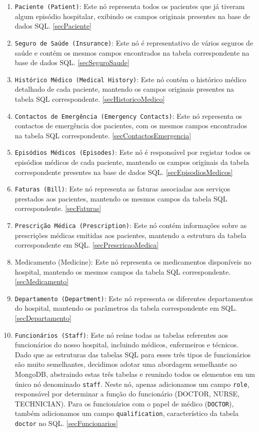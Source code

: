 \begin{enumerate}
    \item \texttt{Paciente (Patient)}: Este nó representa todos os pacientes que já tiveram algum episódio hospitalar, exibindo os campos originais presentes na base de dados SQL. \ref{secPaciente}
    \item \texttt{Seguro de Saúde (Insurance)}: Este nó é representativo de vários seguros de saúde e contém os mesmos campos encontrados na tabela correspondente na base de dados SQL. \ref{secSeguroSaude}
    \item \texttt{Histórico Médico (Medical History)}: Este nó contém o histórico médico detalhado de cada paciente, mantendo os campos originais presentes na tabela SQL correspondente. \ref{secHistoricoMedico}
    \item \texttt{Contactos de Emergência (Emergency Contacts)}: Este nó representa os contactos de emergência dos pacientes, com os mesmos campos encontrados na tabela SQL correspondente. \ref{secContactosEmergencia}
    \item \texttt{Episódios Médicos (Episodes)}: Este nó é responsável por registar todos os episódios médicos de cada paciente, mantendo os campos originais da tabela correspondente presentes na base de dados SQL. \ref{secEpisodiosMedicos}
    \item \texttt{Faturas (Bill)}: Este nó representa as faturas associadas aos serviços prestados aos pacientes, mantendo os mesmos campos da tabela SQL correspondente. \ref{secFaturas}
    \item \texttt{Prescrição Médica (Prescription)}: Este nó contém informações sobre as prescrições médicas emitidas aos pacientes, mantendo a estrutura da tabela correspondente em SQL. \ref{secPrescricaoMedica}
    \item Medicamento (Medicine): Este nó representa os medicamentos disponíveis no hospital, mantendo os mesmos campos da tabela SQL correspondente. \ref{secMedicamento}
    \item \texttt{Departamento (Department)}: Este nó representa os diferentes departamentos do hospital, mantendo os parâmetros da tabela correspondente em SQL.\ref{secDepartamento}
    \item \texttt{Funcionários (Staff)}: Este nó reúne todas as tabelas referentes aos funcionários do nosso hospital, incluindo médicos, enfermeiros e técnicos. Dado que as estruturas das tabelas SQL para esses três tipos de funcionários são muito semelhantes, decidimos adotar uma abordagem semelhante ao MongoDB, abstraindo estas três tabelas e reunindo todos os elementos em um único nó denominado \texttt{staff}. Neste nó, apenas adicionamos um campo \texttt{role}, responsável por determinar a função do funcionário (DOCTOR, NURSE, TECHNICIAN). Para os funcionários com o papel de médico (\texttt{DOCTOR}), também adicionamos um campo \texttt{qualification}, característico da tabela \texttt{doctor} no SQL. \ref{secFuncionarios}

\end{enumerate}

